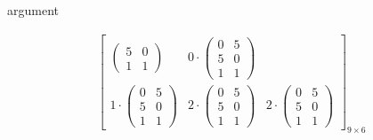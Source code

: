 \begin{labeling}{argument}
\begin{sol}
\begin{align*}
{\begin{bmatrix}
\begin{pmatrix}
                                 5 & 0 \\
                                 1 & 1
                             \end{pmatrix}
                     & 0\cdot\begin{pmatrix}
                                 0 & 5 \\
                                 5 & 0 \\
                                 1 & 1
                             \end{pmatrix}
                    \\[0.8cm]
                    1\cdot\begin{pmatrix}
                              0 & 5 \\
                              5 & 0 \\
                              1 & 1
                          \end{pmatrix}
                     & 2\cdot\begin{pmatrix}
                                 0 & 5 \\
                                 5 & 0 \\
                                 1 & 1
                             \end{pmatrix}
                     & 2\cdot\begin{pmatrix}
                                 0 & 5 \\
                                 5 & 0 \\
                                 1 & 1
                             \end{pmatrix}
                \end{bmatrix}%
            }_{9 \times 6}
        \end{align*}
    \end{sol}
\end{labeling}